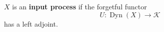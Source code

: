 $X$ is an \textbf{input process} if the forgetful functor
$$U: \operatorname{Dyn}(X) \longrightarrow \mathcal{K}$$
has a left adjoint.
